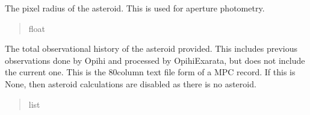 \documentclass[letterpaper,11pt,english]{sphinxmanual}
\begin{document}
\begin{savenotes}
\begin{fulllineitems}
\begin{savenotes}
\begin{fulllineitems}
\begin{quote}
\begin{description}
\end{description}\end{quote}

\end{fulllineitems}\end{savenotes}


\begin{savenotes}\begin{fulllineitems}
\label{\detokenize{code/opihiexarata.opihi.solution:opihiexarata.opihi.solution.OpihiSolution.asteroid_radius}}
\pysigstartsignatures
{}
\pysigstopsignatures
\sphinxAtStartPar
The pixel radius of the asteroid. This is used for aperture photometry.
\begin{quote}\begin{description}
\sphinxAtStartPar
float

\end{description}\end{quote}

\end{fulllineitems}\end{savenotes}


\begin{savenotes}\begin{fulllineitems}
\label{\detokenize{code/opihiexarata.opihi.solution:opihiexarata.opihi.solution.OpihiSolution.asteroid_history}}
\pysigstartsignatures
{}
\pysigstopsignatures
\sphinxAtStartPar
The total observational history of the asteroid provided. This includes
previous observations done by Opihi and processed by OpihiExarata, but
does not include the current one. This is the 80\sphinxhyphen{}column text file
form of a MPC record. If this is None, then asteroid calculations are
disabled as there is no asteroid.
\begin{quote}\begin{description}
\sphinxAtStartPar
list

\end{description}\end{quote}


\end{fulllineitems}
\end{savenotes}
\end{fulllineitems}
\end{savenotes}
\end{document}

